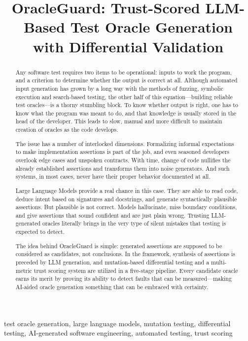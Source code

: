 \documentclass[conference]{IEEEtran}
\title{OracleGuard: Trust-Scored LLM-Based Test Oracle Generation\\with Differential Validation}
\author{
  \IEEEauthorblockN{Omkar Kabde}
  \IEEEauthorblockA{Chaitanya Bharathi Institute of Technology\\
  Hyderabad, India\\
  omkarkabde@gmail.com}
  \and
  \IEEEauthorblockN{Mohammed Imaduddin}
  \IEEEauthorblockA{Chaitanya Bharathi Institute of Technology\\
  Hyderabad, India\\
  mdimad005@gmail.com}
}
\begin{document}
\maketitle

\begin{abstract}
Any software test requires two items to be operational: inputs to work the program, and a criterion to determine whether the output is correct at all. Although automated input generation has grown by a long way with the methods of fuzzing, symbolic execution and search-based testing, the other half of this equation---building reliable test oracles---is a thorny stumbling block. To know whether output is right, one has to know what the program was meant to do, and that knowledge is usually stored in the head of the developer. This leads to slow, manual and more difficult to maintain creation of oracles as the code develops.

The issue has a number of interlocked dimensions. Formalizing informal expectations to make implementation assertions is part of the job, and even seasoned developers overlook edge cases and unspoken contracts. With time, change of code nullifies the already established assertions and transforms them into noise generators. And such systems, in most cases, never have their proper behavior documented at all.

Large Language Models provide a real chance in this case. They are able to read code, deduce intent based on signatures and docstrings, and generate syntactically plausible assertions. But plausible is not correct. Models hallucinate, miss boundary conditions, and give assertions that sound confident and are just plain wrong. Trusting LLM-generated oracles literally brings in the very type of silent mistakes that testing is expected to detect.

The idea behind OracleGuard is simple: generated assertions are supposed to be considered as candidates, not conclusions. In the framework, synthesis of assertions is preceded by LLM generation, and mutation-based differential testing and a multi-metric trust scoring system are utilized in a five-stage pipeline. Every candidate oracle earns its merit by proving its ability to detect faults that can be measured---making AI-aided oracle generation something that can be embraced with certainty.
\end{abstract}

\begin{IEEEkeywords}
test oracle generation, large language models, mutation testing, differential testing, AI-generated software engineering, automated testing, trust scoring
\end{IEEEkeywords}
\end{document}
